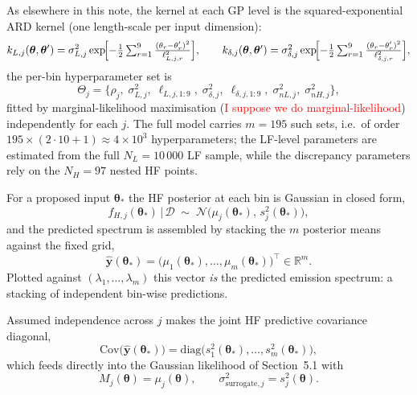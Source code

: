 \documentclass[11pt,a4paper]{article}
\begin{document}
As elsewhere in this note, the kernel at each GP level is the squared-exponential
ARD kernel (one length-scale per input dimension):
\begin{equation}
  k_{L,j}(\boldsymbol\theta,\boldsymbol\theta')
    = \sigma^2_{L,j}\exp\!\Bigl[-\tfrac12\textstyle\sum_{r=1}^{9}
      \tfrac{(\theta_r-\theta'_r)^2}{\ell^{2}_{L,j,r}}\Bigr],
  \qquad
  k_{\delta,j}(\boldsymbol\theta,\boldsymbol\theta')
    = \sigma^2_{\delta,j}\exp\!\Bigl[-\tfrac12\textstyle\sum_{r=1}^{9}
      \tfrac{(\theta_r-\theta'_r)^2}{\ell^{2}_{\delta,j,r}}\Bigr],
\end{equation}
the per-bin hyperparameter set is
\begin{equation}
  \Theta_j=\bigl\{\rho_j,\;\sigma^2_{L,j},\;\boldsymbol\ell_{L,j,1:9},\;
    \sigma^2_{\delta,j},\;\boldsymbol\ell_{\delta,j,1:9},\;
    \sigma^2_{nL,j},\;\sigma^2_{nH,j}\bigr\},
\end{equation}
fitted by marginal-likelihood maximisation (\textcolor{red}{I suppose we do marginal-likelihood}) independently for each $j$. The full model carries $m=195$ such sets, i.e.\ of order
$195\times(2\!\cdot\!10+1)\approx 4\times10^{3}$ hyperparameters; the LF-level parameters are estimated from the full $N_{L}=10\,000$ LF sample, while the discrepancy parameters rely on the $N_{H}=97$ nested HF points.

For a proposed input $\boldsymbol\theta_\ast$ the HF posterior at each bin is
Gaussian in closed form,
\begin{equation}
  f_{H,j}(\boldsymbol\theta_\ast)\,\big|\,\mathcal{D}
    \;\sim\; \mathcal{N}\!\bigl(\mu_j(\boldsymbol\theta_\ast),\,
                                 s^2_j(\boldsymbol\theta_\ast)\bigr),
\end{equation}
and the predicted spectrum is assembled by stacking the $m$ posterior means against
the fixed grid,
\begin{equation}
  \hat{\mathbf{y}}(\boldsymbol\theta_\ast)
    = \bigl(\mu_1(\boldsymbol\theta_\ast),\dots,\mu_m(\boldsymbol\theta_\ast)\bigr)^{\!\top}
    \in\mathbb{R}^{m}.
\end{equation}
Plotted against $(\lambda_1,\dots,\lambda_m)$ this vector \emph{is} the predicted emission spectrum: a stacking of independent bin-wise predictions. 

Assumed independence across $j$ makes the joint HF predictive covariance diagonal,
\begin{equation}
  \mathrm{Cov}\!\bigl(\hat{\mathbf{y}}(\boldsymbol\theta_\ast)\bigr)
    = \mathrm{diag}\!\bigl(s^2_1(\boldsymbol\theta_\ast),\dots,
                            s^2_m(\boldsymbol\theta_\ast)\bigr),
\end{equation}
which feeds directly into the Gaussian likelihood of Section~5.1 with
\begin{equation}
  M_j(\boldsymbol\theta) = \mu_j(\boldsymbol\theta),
  \qquad
  \sigma^2_{\mathrm{surrogate},j} = s^2_j(\boldsymbol\theta).
\end{equation}
\end{document}
